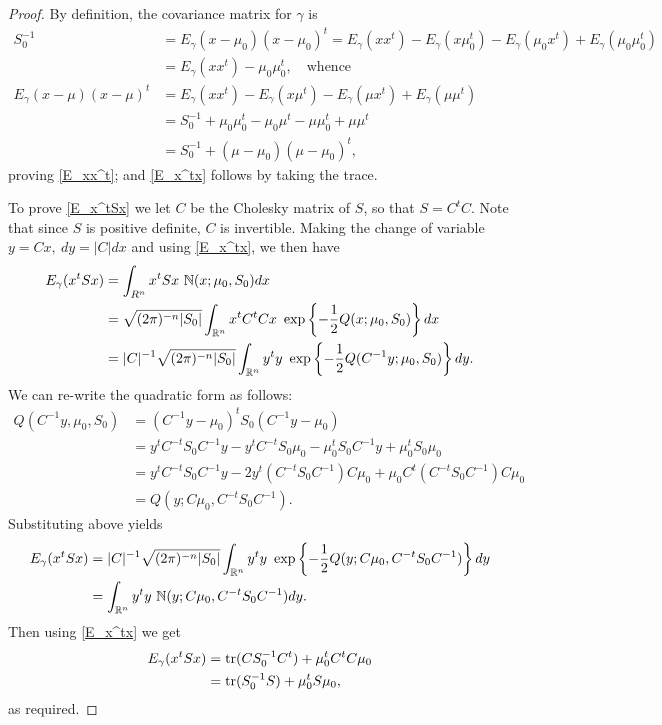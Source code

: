 \documentclass[12pt,leqno]{article}
\begin{document}
  \begin{proof}
    By definition, the covariance matrix for $\gamma$ is
    \begin{align*}
    S_0^{-1} &= E_{\gamma}(x-\mu_0)(x-\mu_0)^t = E_{\gamma}(xx^t) - E_{\gamma}(x\mu_0^t) - E_{\gamma}(\mu_0{x}^t) + E_{\gamma}(\mu_0\mu_0^t)\\
    &= E_{\gamma}(xx^t) - \mu_0\mu_0^t, \quad\text{whence}\\
    E_{\gamma}(x-\mu)(x-\mu)^t &= E_{\gamma}(xx^t) - E_{\gamma}(x\mu^t) - E_{\gamma}(\mu{x}^t) + E_{\gamma}(\mu\mu^t) \\
    &= S_0^{-1} + \mu_0\mu_0^t - \mu_0\mu^t-\mu\mu_0^t + \mu\mu^t\\
    &= S_0^{-1} + (\mu-\mu_0)(\mu-\mu_0)^t,
    \end{align*}
    proving \eqref{E_xx^t}; and \eqref{E_x^tx} follows by taking the trace.

    To prove \eqref{E_x^tSx} we let $C$ be the Cholesky matrix of $S$, so that
    $S = C^tC$.  Note that since $S$ is positive definite, $C$ is invertible.
    Making the change of variable $y = Cx,~ dy = |C|dx$ and using \eqref{E_x^tx}, we then have
      \begin{align*}
        E_{\gamma}(x^tSx) &= \int_{R^n}x^tSx~{\mathbb N}(x;\mu_0,S_0)dx\\
        &= \sqrt{(2\pi)^{-n}|S_0|}\int_{{\mathbb R}^n}x^tC^tCx~\exp\left\{-\frac{1}{2}Q(x;\mu_0,S_0)\right\}dx \\
        &= |C|^{-1}\sqrt{(2\pi)^{-n}|S_0|}\int_{{\mathbb R}^n}y^ty~\exp\left\{-\frac{1}{2}Q(C^{-1}y;\mu_0,S_0)\right\}dy.
      \end{align*}
      We can re-write the quadratic form as follows:
      \begin{align*}
        Q(C^{-1}y,\mu_0,S_0) &= (C^{-1}y-\mu_0)^tS_0(C^{-1}y-\mu_0)\\
        &= y^tC^{-t}S_0C^{-1}y - y^tC^{-t}S_0\mu_0 - \mu_0^tS_0C^{-1}y + \mu_0^tS_0\mu_0 \\
        &= y^tC^{-t}S_0C^{-1}y - 2y^t(C^{-t}S_0C^{-1})C\mu_0 + \mu_0C^t(C^{-t}S_0C^{-1})C\mu_0\\
        &= Q(y;C\mu_0,C^{-t}S_0C^{-1}).
      \end{align*}
      Substituting above yields
      \begin{align*}
        E_{\gamma}(x^tSx) &=  |C|^{-1}\sqrt{(2\pi)^{-n}|S_0|}\int_{{\mathbb R}^n}y^ty~\exp\left\{-\frac{1}{2}Q(y;C\mu_0,C^{-t}S_0C^{-1})\right\}dy \\
        &= \int_{{\mathbb R}^n}y^ty~{\mathbb N}(y;C\mu_0,C^{-t}S_0C^{-1})dy.
      \end{align*}
      Then using \eqref{E_x^tx} we get
      \begin{align*}
        E_{\gamma}(x^tSx) &=  \text{\rm tr}(CS_0^{-1}C^t) + \mu_0^tC^tC\mu_0 \\
        &= \text{\rm tr}(S_0^{-1}S) + \mu_0^tS\mu_0,
      \end{align*}
      as required.


\end{proof}
\end{document}
